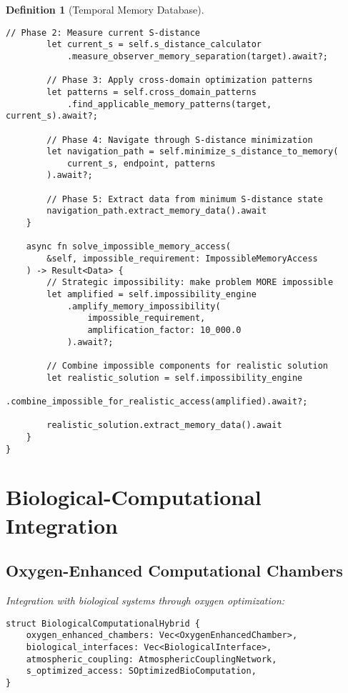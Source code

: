 \documentclass[12pt]{article}
\newtheorem{definition}[theorem]{Definition}
\begin{document}
\begin{definition}[Temporal Memory Database]
\begin{lstlisting}[caption=S-Constant Memory Optimization]
        // Phase 2: Measure current S-distance  
        let current_s = self.s_distance_calculator
            .measure_observer_memory_separation(target).await?;
        
        // Phase 3: Apply cross-domain optimization patterns
        let patterns = self.cross_domain_patterns
            .find_applicable_memory_patterns(target, current_s).await?;
        
        // Phase 4: Navigate through S-distance minimization
        let navigation_path = self.minimize_s_distance_to_memory(
            current_s, endpoint, patterns
        ).await?;
        
        // Phase 5: Extract data from minimum S-distance state
        navigation_path.extract_memory_data().await
    }
    
    async fn solve_impossible_memory_access(
        &self, impossible_requirement: ImpossibleMemoryAccess
    ) -> Result<Data> {
        // Strategic impossibility: make problem MORE impossible  
        let amplified = self.impossibility_engine
            .amplify_memory_impossibility(
                impossible_requirement, 
                amplification_factor: 10_000.0
            ).await?;
        
        // Combine impossible components for realistic solution
        let realistic_solution = self.impossibility_engine
            .combine_impossible_for_realistic_access(amplified).await?;
        
        realistic_solution.extract_memory_data().await
    }
}
\end{lstlisting}

\section{Biological-Computational Integration}

\subsection{Oxygen-Enhanced Computational Chambers}

Integration with biological systems through oxygen optimization:

\begin{lstlisting}[caption=Bio-Compatible Computation]
struct BiologicalComputationalHybrid {
    oxygen_enhanced_chambers: Vec<OxygenEnhancedChamber>,
    biological_interfaces: Vec<BiologicalInterface>,
    atmospheric_coupling: AtmosphericCouplingNetwork,
    s_optimized_access: SOptimizedBioComputation,
}


\end{lstlisting}
\end{definition}
\end{document}
